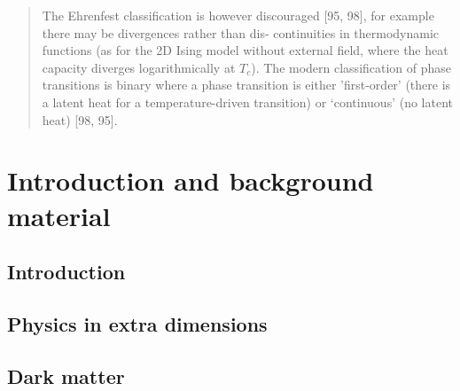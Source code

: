 \documentclass[nocoverpage,swedish,g5paper]{thesis}
\newcommand{\todo}[1]{(\textbf{TODO:} #1)}
\begin{document}
\begin{abstract}
The Ehrenfest classification is however discouraged [95, 98], for example there may be divergences rather than dis- continuities in thermodynamic functions (as for the 2D Ising model without external field, where the heat capacity diverges logarithmically at $T_c$).
The modern classification of phase transitions is binary where a phase transition is either 'first-order' (there is a latent heat for a temperature-driven transition) or ‘continuous’ (no latent heat) [98, 95].

\end{abstract}


\begin{preface}

\end{preface}

\tableofcontents

\mainmatter

\part{Introduction and background material}

\chapter{Introduction}


\chapter{Physics in extra dimensions}\label{ch:ExtraDimensions}


\chapter{Dark matter}\label{ch:DarkMatter}

\end{document}
